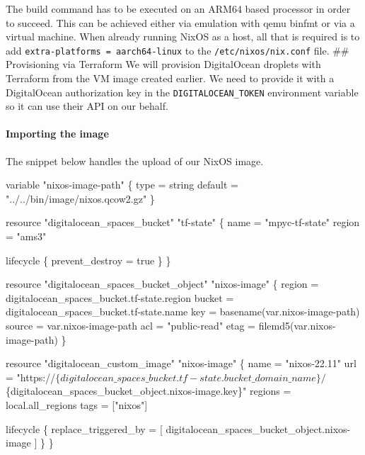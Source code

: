 \documentclass[
]{article}
\newenvironment{Shaded}{}{}
\newcommand{\NormalTok}[1]{#1}
\begin{document}
The build command has to be executed on an ARM64 based processor in
order to succeed. This can be achieved either via emulation with qemu
binfmt or via a virtual machine. When already running NixOS as a host,
all that is required is to add
\texttt{extra-platforms\ =\ aarch64-linux} to the
\texttt{/etc/nixos/nix.conf} file. \#\# Provisioning via Terraform We
will provision DigitalOcean droplets with Terraform from the VM image
created earlier. We need to provide it with a DigitalOcean authorization
key in the \texttt{DIGITALOCEAN\_TOKEN} environment variable so it can
use their API on our behalf.

\hypertarget{importing-the-image}{%
  \paragraph{Importing the image}\label{importing-the-image}}

The snippet below handles the upload of our NixOS image.

\begin{Shaded}
  \begin{Highlighting}[]
    \NormalTok{variable "nixos{-}image{-}path" \{}
    \NormalTok{  type    = string}
    \NormalTok{  default = "../../bin/image/nixos.qcow2.gz"}
    \NormalTok{\}}

    \NormalTok{resource "digitalocean\_spaces\_bucket" "tf{-}state" \{}
    \NormalTok{  name   = "mpyc{-}tf{-}state"}
    \NormalTok{  region = "ams3"}

    \NormalTok{  lifecycle \{}
    \NormalTok{    prevent\_destroy = true}
    \NormalTok{  \}}
    \NormalTok{\}}

    \NormalTok{resource "digitalocean\_spaces\_bucket\_object" "nixos{-}image" \{}
    \NormalTok{  region = digitalocean\_spaces\_bucket.tf{-}state.region}
    \NormalTok{  bucket = digitalocean\_spaces\_bucket.tf{-}state.name}
    \NormalTok{  key    = basename(var.nixos{-}image{-}path)}
    \NormalTok{  source = var.nixos{-}image{-}path}
    \NormalTok{  acl    = "public{-}read"}
    \NormalTok{  etag   = filemd5(var.nixos{-}image{-}path)}
    \NormalTok{\}}

    \NormalTok{resource "digitalocean\_custom\_image" "nixos{-}image" \{}
    \NormalTok{  name    = "nixos{-}22.11"}
    \NormalTok{  url     = "https://$\{digitalocean\_spaces\_bucket.tf{-}state.bucket\_domain\_name\}/$\{digitalocean\_spaces\_bucket\_object.nixos{-}image.key\}"}
    \NormalTok{  regions = local.all\_regions}
    \NormalTok{  tags    = ["nixos"]}

    \NormalTok{  lifecycle \{}
    \NormalTok{    replace\_triggered\_by = [}
    \NormalTok{      digitalocean\_spaces\_bucket\_object.nixos{-}image}
    \NormalTok{    ]}
    \NormalTok{  \}}
    \NormalTok{\}}
  \end{Highlighting}
\end{Shaded}
\end{document}
